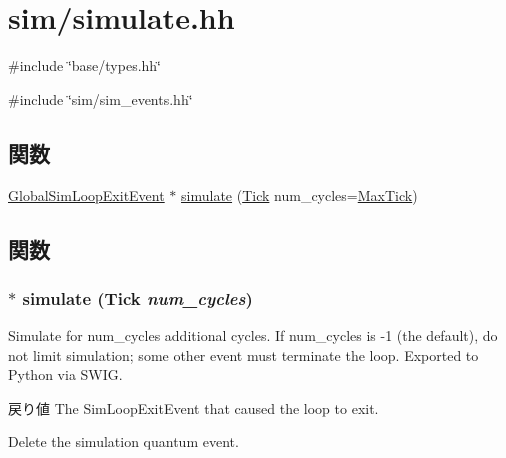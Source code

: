 \hypertarget{simulate_8hh}{
\section{sim/simulate.hh}
\label{simulate_8hh}
}
{\ttfamily \#include \char`\"{}base/types.hh\char`\"{}}\par
{\ttfamily \#include \char`\"{}sim/sim\_\-events.hh\char`\"{}}\par
\subsection*{関数}
\begin{DoxyCompactItemize}
\item 
\hyperlink{classGlobalSimLoopExitEvent}{GlobalSimLoopExitEvent} $\ast$ \hyperlink{simulate_8hh_ad45dde1b8c7dd383b7534bcc6ed456ec}{simulate} (\hyperlink{base_2types_8hh_a5c8ed81b7d238c9083e1037ba6d61643}{Tick} num\_\-cycles=\hyperlink{base_2types_8hh_abe940b1b328825e234da719447e15ca5}{MaxTick})
\end{DoxyCompactItemize}


\subsection{関数}
\hypertarget{simulate_8hh_ad45dde1b8c7dd383b7534bcc6ed456ec}{
\subsubsection[{simulate}]{$\ast$ simulate ({\bf Tick} {\em num\_\-cycles})}}
\label{simulate_8hh_ad45dde1b8c7dd383b7534bcc6ed456ec}
Simulate for num\_\-cycles additional cycles. If num\_\-cycles is -\/1 (the default), do not limit simulation; some other event must terminate the loop. Exported to Python via SWIG. \begin{DoxyReturn}{戻り値}
The SimLoopExitEvent that caused the loop to exit. 
\end{DoxyReturn}


Delete the simulation quantum event. 


